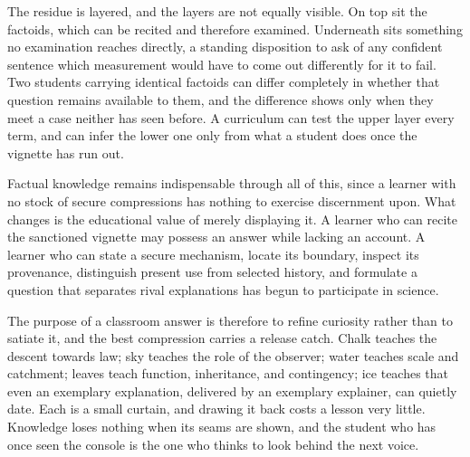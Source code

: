 The residue is layered, and the layers are not equally visible. On top sit the factoids, which can be recited and therefore examined. Underneath sits something no examination reaches directly, a standing disposition to ask of any confident sentence which measurement would have to come out differently for it to fail. Two students carrying identical factoids can differ completely in whether that question remains available to them, and the difference shows only when they meet a case neither has seen before. A curriculum can test the upper layer every term, and can infer the lower one only from what a student does once the vignette has run out.

Factual knowledge remains indispensable through all of this, since a learner with no stock of secure compressions has nothing to exercise discernment upon. What changes is the educational value of merely displaying it. A learner who can recite the sanctioned vignette may possess an answer while lacking an account. A learner who can state a secure mechanism, locate its boundary, inspect its provenance, distinguish present use from selected history, and formulate a question that separates rival explanations has begun to participate in science.

The purpose of a classroom answer is therefore to refine curiosity rather than to satiate it, and the best compression carries a release catch. Chalk teaches the descent towards law; sky teaches the role of the observer; water teaches scale and catchment; leaves teach function, inheritance, and contingency; ice teaches that even an exemplary explanation, delivered by an exemplary explainer, can quietly date. Each is a small curtain, and drawing it back costs a lesson very little. Knowledge loses nothing when its seams are shown, and the student who has once seen the console is the one who thinks to look behind the next voice.

\clearpage
{}




